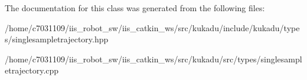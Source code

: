 The documentation for this class was generated from the following files\-:\begin{DoxyCompactItemize}
\item 
/home/c7031109/iis\-\_\-robot\-\_\-sw/iis\-\_\-catkin\-\_\-ws/src/kukadu/include/kukadu/types/singlesampletrajectory.\-hpp\item 
/home/c7031109/iis\-\_\-robot\-\_\-sw/iis\-\_\-catkin\-\_\-ws/src/kukadu/src/types/singlesampletrajectory.\-cpp\end{DoxyCompactItemize}
